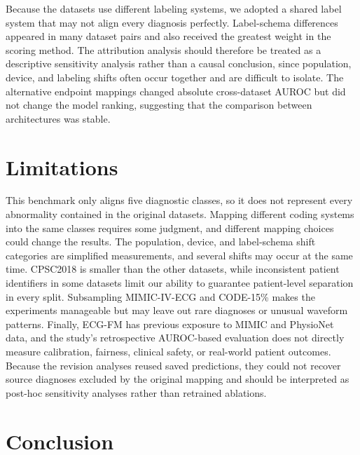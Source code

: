 \documentclass{article}
\begin{document}
Because the datasets use different labeling systems, we adopted a shared label system that may not align every diagnosis perfectly. Label-schema differences appeared in many dataset pairs and also received the greatest weight in the scoring method. The attribution analysis should therefore be treated as a descriptive sensitivity analysis rather than a causal conclusion, since population, device, and labeling shifts often occur together and are difficult to isolate. The alternative endpoint mappings changed absolute cross-dataset AUROC but did not change the model ranking, suggesting that the comparison between architectures was stable.

\section{Limitations}

This benchmark only aligns five diagnostic classes, so it does not represent every abnormality contained in the original datasets. Mapping different coding systems into the same classes requires some judgment, and different mapping choices could change the results. The population, device, and label-schema shift categories are simplified measurements, and several shifts may occur at the same time. CPSC2018 is smaller than the other datasets, while inconsistent patient identifiers in some datasets limit our ability to guarantee patient-level separation in every split. Subsampling MIMIC-IV-ECG and CODE-15\% makes the experiments manageable but may leave out rare diagnoses or unusual waveform patterns. Finally, ECG-FM has previous exposure to MIMIC and PhysioNet data, and the study's retrospective AUROC-based evaluation does not directly measure calibration, fairness, clinical safety, or real-world patient outcomes. Because the revision analyses reused saved predictions, they could not recover source diagnoses excluded by the original mapping and should be interpreted as post-hoc sensitivity analyses rather than retrained ablations.

\section{Conclusion}
\end{document}

